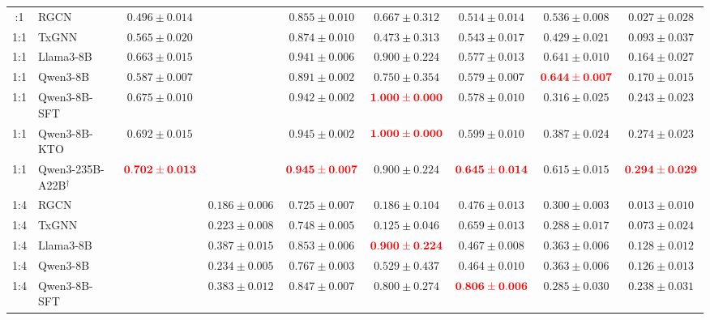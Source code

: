 \documentclass[pdflatex,sn-mathphys-num]{sn-jnl}
\begin{document}
\begin{landscape}
\begin{longtable}{clccccccc}
\bottomrule
\endlastfoot
1:1 & RGCN & \(0.496 \pm 0.014\) &  & \(0.855 \pm 0.010\) & \(0.667 \pm 0.312\) & \(0.514 \pm 0.014\) & \(0.536 \pm 0.008\) & \(0.027 \pm 0.028\) \\
1:1 & TxGNN & \(0.565 \pm 0.020\) &  & \(0.874 \pm 0.010\) & \(0.473 \pm 0.313\) & \(0.543 \pm 0.017\) & \(0.429 \pm 0.021\) & \(0.093 \pm 0.037\) \\
1:1 & Llama3-8B & \(0.663 \pm 0.015\) &  & \(0.941 \pm 0.006\) & \(\mathbf{0.900 \pm 0.224}\) & \(0.577 \pm 0.013\) & \(\mathbf{0.641 \pm 0.010}\) & \(0.164 \pm 0.027\) \\
1:1 & Qwen3-8B & \(0.587 \pm 0.007\) &  & \(0.891 \pm 0.002\) & \(0.750 \pm 0.354\) & \(0.579 \pm 0.007\) & \(\textcolor{red}{\mathbf{0.644 \pm 0.007}}\) & \(0.170 \pm 0.015\) \\
1:1 & Qwen3-8B-SFT & \(0.675 \pm 0.010\) &  & \(0.942 \pm 0.002\) & \(\textcolor{red}{\mathbf{1.000 \pm 0.000}}\) & \(0.578 \pm 0.010\) & \(0.316 \pm 0.025\) & \(0.243 \pm 0.023\) \\
1:1 & Qwen3-8B-KTO & \(\mathbf{0.692 \pm 0.015}\) &  & \(\mathbf{0.945 \pm 0.002}\) & \(\textcolor{red}{\mathbf{1.000 \pm 0.000}}\) & \(\mathbf{0.599 \pm 0.010}\) & \(0.387 \pm 0.024\) & \(\mathbf{0.274 \pm 0.023}\) \\
1:1 & Qwen3-235B-A22B$^{\dagger}$ & \(\textcolor{red}{\mathbf{0.702 \pm 0.013}}\) &  & \(\textcolor{red}{\mathbf{0.945 \pm 0.007}}\) & \(\mathbf{0.900 \pm 0.224}\) & \(\textcolor{red}{\mathbf{0.645 \pm 0.014}}\) & \(0.615 \pm 0.015\) & \(\textcolor{red}{\mathbf{0.294 \pm 0.029}}\) \\
\midrule
1:4 & RGCN &  & \(0.186 \pm 0.006\) & \(0.725 \pm 0.007\) & \(0.186 \pm 0.104\) & \(0.476 \pm 0.013\) & \(0.300 \pm 0.003\) & \(0.013 \pm 0.010\) \\
1:4 & TxGNN &  & \(0.223 \pm 0.008\) & \(0.748 \pm 0.005\) & \(0.125 \pm 0.046\) & \(0.659 \pm 0.013\) & \(0.288 \pm 0.017\) & \(0.073 \pm 0.024\) \\
1:4 & Llama3-8B &  & \(0.387 \pm 0.015\) & \(0.853 \pm 0.006\) & \(\textcolor{red}{\mathbf{0.900 \pm 0.224}}\) & \(0.467 \pm 0.008\) & \(\mathbf{0.363 \pm 0.006}\) & \(0.128 \pm 0.012\) \\
1:4 & Qwen3-8B &  & \(0.234 \pm 0.005\) & \(0.767 \pm 0.003\) & \(0.529 \pm 0.437\) & \(0.464 \pm 0.010\) & \(0.363 \pm 0.006\) & \(0.126 \pm 0.013\) \\
1:4 & Qwen3-8B-SFT &  & \(0.383 \pm 0.012\) & \(0.847 \pm 0.007\) & \(\mathbf{0.800 \pm 0.274}\) & \(\textcolor{red}{\mathbf{0.806 \pm 0.006}}\) & \(0.285 \pm 0.030\) & \(0.238 \pm 0.031\) \\

\end{longtable}
\end{landscape}
\end{document}
